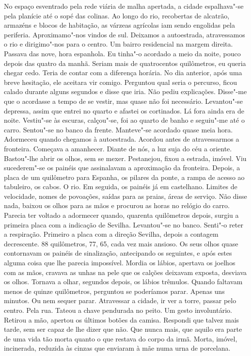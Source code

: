 No espaço esventrado pela rede viária de malha apertada, a cidade
espalhava"-se pela planície até o sopé das colinas. Ao longo do rio,
recobertas de alcatrão, armazéns e blocos de habitação, as várzeas
agrícolas iam sendo engolidas pela periferia. Aproximamo"-nos vindos de
sul. Deixamos a autoestrada, atravessamos o rio e dirigimo"-nos para o
centro. Um bairro residencial na margem direita. Passava das nove, hora
espanhola. Eu tinha"-o acordado a meio da noite, pouco depois das quatro
da manhã. Seriam mais de quatrocentos quilômetros, eu queria chegar
cedo. Teria de contar com a diferença horária. No dia anterior, após uma
breve hesitação, ele aceitara vir comigo. Perguntou qual seria o
percurso, ficou calado durante alguns segundos e disse que iria. Não
pediu explicações. Disse"-me que o acordasse a tempo de se vestir, mas
quase não foi necessário. Levantou"-se depressa, assim que entrei no
quarto e afastei os cortinados. Lá fora ainda era de noite. Vestiu"-se
às escuras, calçou"-se, foi ao quarto de banho e seguiu"-me até o
carro. Sentou"-se no banco da frente. Manteve"-se acordado quase meia
hora. Adormeceu quando chegamos à autoestrada. Acordou antes de
atravessarmos a fronteira. Começava a amanhecer. Diante de nós, a luz
suja do céu a oriente. Bastou"-lhe abrir os olhos, sem se mexer.
Pestanejou, fixou a estrada, imóvel. Viu sucederem"-se os painéis que
assinalavam a aproximação da fronteira. Depois, a placa de um quilômetro
para Espanha, os pilares da ponte, a rampa de acesso ao tabuleiro, os
cabos. O rio. Em seguida, os painéis já em castelhano. Limites de
velocidade, nomes de povoações, saídas para as praias, áreas de serviço.
Não disse nada, baixou os olhos para as mãos e procurou as horas no
relógio do carro. Parecia ter voltado a adormecer quando, quarenta
quilômetros depois, surgiu a primeira placa com a indicação de Sevilha.
Levantou"-se no banco. Senti"-o reter a respiração. Primeiro a placa com
a direção Sevilha, depois a contagem decrescente. 88 quilômetros, 77,
65, cada vez mais ansioso. Os seus olhos quase contornavam os painéis de
sinalização, antecipando os seguintes, e após estes alguma coisa que lhe
parecia impossível. Mordia os lábios, apertava os joelhos com as mãos,
cravava as unhas na pele que os calções deixavam exposta, desviava os
olhos. Tornava a olhar, segundos depois, os lábios trêmulos. Quando
faltavam menos de quinze quilômetros, perguntou se poderíamos parar.
Apenas uns minutos. Ou nem sequer parar. Atravessar a cidade, ir ver a
torre, passar pelo centro. Pela rua. Tateou a chave pendurada no peito.
Um gesto involuntário. Retirou a mão, apertou os últimos botões da
camisa. Respondi que talvez mais tarde, sem ser capaz de lhe dizer que
não. Que nunca mais, que aquilo era parte de uma vida tão morta quanto o
que restava do corpo da irmã. Morta, imóvel, incinerada, reduzida às
cinzas que enviaram à mãe numa urna de porcelana.

